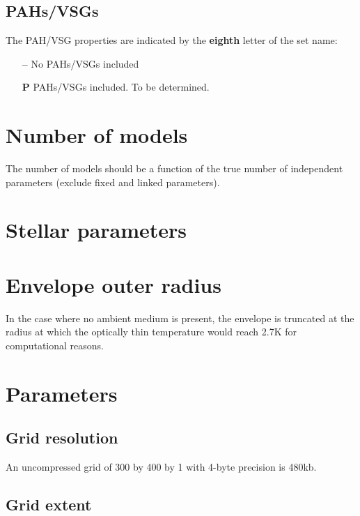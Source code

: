 \documentclass[10pt]{article}
\begin{document}
\subsection{PAHs/VSGs}

The PAH/VSG properties are indicated by the \textbf{eighth} letter of the set name:

\begin{itemize}

\item[\textbf{--}] No PAHs/VSGs included

\item[\textbf{P}] PAHs/VSGs included. To be determined.
      
\end{itemize}

\section{Number of models}

The number of models should be a function of the true number of independent parameters (exclude fixed and linked parameters).

\section{Stellar parameters}


\section{Envelope outer radius}

In the case where no ambient medium is present, the envelope is truncated at the radius at which the optically thin temperature would reach 2.7K for computational reasons.

\section{Parameters}

\subsection{Grid resolution}

An uncompressed grid of 300 by 400 by 1 with 4-byte precision is 480kb.

\subsection{Grid extent}
\end{document}
